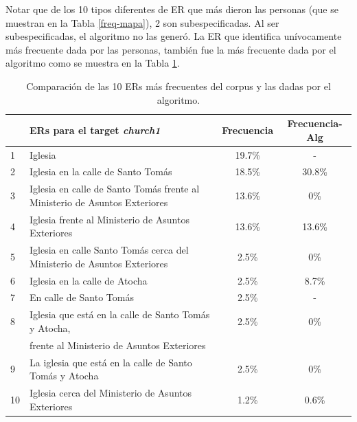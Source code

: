 Notar que de los 10 tipos diferentes de ER que m\'as dieron las personas (que se muestran en la Tabla \ref{freq-mapa}), 
2 son subespecificadas. Al ser subespecificadas, el algoritmo no las gener\'o. 
La ER que identifica un\'ivocamente m\'as frecuente dada por las personas, tambi\'en fue la m\'as frecuente dada por el algoritmo como se muestra en la Tabla \ref{compara-corpus-alg}. 

\begin{table}[H]
{\footnotesize
\begin{center}
\begin{tabular}{|l|l|c|c|}
\hline
&ERs para el target {\it church1} 					      &  Frecuencia & Frecuencia-Alg\\ \hline \hline
1&Iglesia 								 &19.7\%  &  -\\ \hline
2&Iglesia en la calle de Santo Tom\'as						 &18.5\% 	& 30.8\%  \\ \hline
3&Iglesia en calle de Santo Tom\'as frente al Ministerio de Asuntos Exteriores        &13.6\% & 0\% \\ \hline
4&Iglesia frente al Ministerio de Asuntos Exteriores 			 &13.6\% & 13.6\%  \\ \hline
5&Iglesia en calle Santo Tom\'as cerca del Ministerio de Asuntos Exteriores        &2.5\% & 0\%  \\ \hline
6&Iglesia en la calle de Atocha							&2.5\%  &8.7\%  \\ \hline
7&En calle de Santo Tom\'as 							&2.5\% 	& -  \\ \hline
8&Iglesia que est\'a en la calle de Santo Tom\'as y Atocha, 	 &2.5\%	& 0\% \\ 
&frente al Ministerio de Asuntos Exteriores						 && \\ \hline
9&La iglesia que est\'a en la calle de Santo Tom\'as y Atocha			 &2.5\% 	& 0\%  \\ \hline
10&Iglesia cerca del Ministerio de Asuntos Exteriores				 &1.2\% 	&0.6\%  \\ \hline
\end{tabular}
\caption{Comparaci\'on de las 10 ERs m\'as frecuentes del corpus y las dadas por el algoritmo.}\label{compara-corpus-alg}
\end{center}
}
\end{table}



